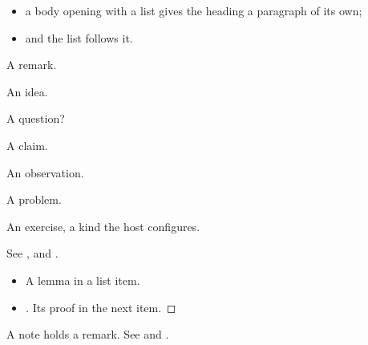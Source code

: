 \begin{definition}\flmLabels{\label{ref7}}
\begin{itemize}
\item a body opening with a list gives the heading a paragraph of its own;
\item and the list follows it.
\end{itemize}
\end{definition}

\begin{remark}\flmLabels{\label{ref8}}
A remark.
\end{remark}

\begin{idea}
An idea.
\end{idea}

\begin{question}
A question?
\end{question}

\begin{claim}
A claim.
\end{claim}

\begin{observation}
An observation.
\end{observation}

\begin{problem}
A problem.
\end{problem}

\begin{exercise}\flmLabels{\label{ref9}}
An exercise, a kind the host configures.
\end{exercise}

See ,  and .

\begin{itemize}
\item\begin{lemma}\flmLabels{\label{ref10}}
A lemma in a list item.
\end{lemma}
\item\begin{proof}[{}]
Its proof in the next item.
\end{proof}
\end{itemize}

A note holds a remark. See  and .

